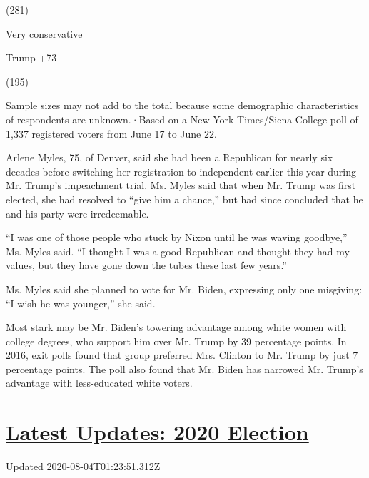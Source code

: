 (281)

Very conservative

Trump +73

(195)

Sample sizes may not add to the total because some demographic
characteristics of respondents are unknown.·Based on a New York
Times/Siena College poll of 1,337 registered voters from June 17 to June
22.

Arlene Myles, 75, of Denver, said she had been a Republican for nearly
six decades before switching her registration to independent earlier
this year during Mr. Trump's impeachment trial. Ms. Myles said that when
Mr. Trump was first elected, she had resolved to ``give him a chance,''
but had since concluded that he and his party were irredeemable.

``I was one of those people who stuck by Nixon until he was waving
goodbye,'' Ms. Myles said. ``I thought I was a good Republican and
thought they had my values, but they have gone down the tubes these last
few years.''

Ms. Myles said she planned to vote for Mr. Biden, expressing only one
misgiving: ``I wish he was younger,'' she said.

Most stark may be Mr. Biden's towering advantage among white women with
college degrees, who support him over Mr. Trump by 39 percentage points.
In 2016, exit polls found that group preferred Mrs. Clinton to Mr. Trump
by just 7 percentage points. The poll also found that Mr. Biden has
narrowed Mr. Trump's advantage with less-educated white voters.

\hypertarget{latest-updates-2020-election}{%
\section{\texorpdfstring{\href{https://www.nytimes3xbfgragh.onion/2020/08/03/us/elections/biden-vs-trump.html?action=click\&pgtype=Article\&state=default\&region=MAIN_CONTENT_1\&context=storylines_live_updates}{Latest
Updates: 2020
Election}}{Latest Updates: 2020 Election}}\label{latest-updates-2020-election}}

Updated 2020-08-04T01:23:51.312Z

